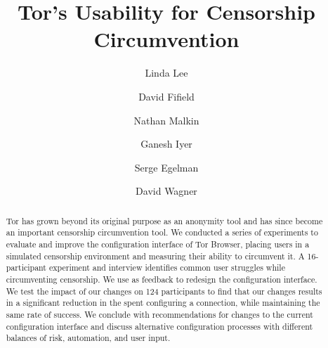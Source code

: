 \documentclass[USenglish,oneside,twocolumn]{article}
\begin{document}
 
  \author*[1]{Linda Lee}

  \author[2]{David Fifield}

  \author[3]{Nathan Malkin}

  \author[4]{Ganesh Iyer}

  \author[5]{Serge Egelman}
  
  \author[6]{David Wagner}




  
   

  \title{\huge Tor's Usability for Censorship Circumvention}



  \begin{abstract}
{Tor has grown beyond its original purpose as an anonymity tool and has 
since become an important censorship circumvention tool.
We conducted a series of
experiments to evaluate and improve the configuration interface of Tor Browser,
placing users in a simulated censorship environment and measuring their ability to circumvent it.
A 16-participant experiment and interview
identifies common user struggles while circumventing censorship.
We use as feedback to redesign the configuration interface.
We test the impact of our
changes on 124 participants to find that our changes results in a significant reduction 
in the spent configuring a connection, while maintaining the same rate of success. We
conclude with recommendations for changes to the current configuration interface and discuss
alternative configuration processes with different balances of risk, automation, and user input.}
\end{abstract}
\end{document}

